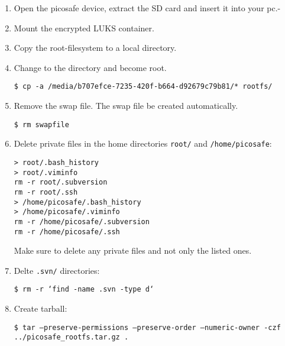 \begin{enumerate}
\item Open the picosafe device, extract the SD card and insert it into your pc.-
\item Mount the encrypted LUKS container.
\item Copy the root-filesystem to a local directory.
\item Change to the directory and become root.

\texttt{\$ cp -a /media/b707efce-7235-420f-b664-d92679c79b81/* rootfs/}

\item Remove the swap file. The swap file be created automatically.

\texttt{\$ rm swapfile}

\item Delete private files in the home directories \texttt{root/} and \texttt{/home/picosafe}:

\texttt{> root/.bash\_history} \\
\texttt{> root/.viminfo} \\
\texttt{rm -r root/.subversion} \\
\texttt{rm -r root/.ssh} \\
\texttt{> /home/picosafe/.bash\_history} \\
\texttt{> /home/picosafe/.viminfo} \\
\texttt{rm -r /home/picosafe/.subversion} \\
\texttt{rm -r /home/picosafe/.ssh}

Make sure to delete any private files and not only the listed ones.

\item Delte \texttt{.svn/} directories:

\texttt{\$ rm -r `find -name .svn -type d`}

\item Create tarball:

\texttt{\$ tar --preserve-permissions --preserve-order --numeric-owner -czf ../picosafe\_rootfs.tar.gz .}

\end{enumerate}
